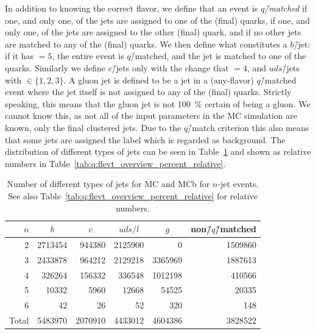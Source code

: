 In addition to knowing the correct flavor, we define that an event is \emph{$q$\=/matched} if one, and only one, of the jets are assigned to one of the (final) quarks, if one, and only one, of the jets are assigned to the other (final) quark, and if no other jets are matched to any of the (final) quarks. We then define what constitutes a $b$\=/jet: if it has  $= 5$, the entire event is $q$\=/matched, and the jet is matched to one of the quarks. Similarly we define $c$\=/jets only with the change that  $= 4$, and $uds$\=/jets with  $\in \{1, 2, 3\}$. A gluon jet is defined to be a jet in a (any-flavor) $q$\=/matched event where the jet itself is not assigned to any of the (final) quarks. Strictly speaking, this means that the gluon jet is not \SI{100}{\percent} certain of being a gluon. We cannot know this, as not all of the input parameters in the MC simulation are known, only the final clustered jets. Due to the $q$\=/match criterion this also means that some jets are assigned the label  which is regarded as background. The distribution of different types of jets can be seen in Table~\ref{tab:q:flevt_overview} and shown as relative numbers in Table~\ref{tab:q:flevt_overview_percent_relative}.
\vspace{-2mm}
\begin{table}[h!]
  \centering
  \begin{tabular}{@{}rrrrrr@{}}
    $n$    & \multicolumn{1}{c}{$b$} & \multicolumn{1}{c}{$c$} & \multicolumn{1}{c}{$uds / l$} & \multicolumn{1}{c}{$g$} & non\=/$q$\=/matched    \\ 
    \midrule
    \num{2}     & \num{2713454} &  \num{944380} & \num{2125900} &       \num{0} & \num{1509860} \\
    \num{3}     & \num{2433878} &  \num{964212} & \num{2129218} & \num{3365969} & \num{1887613} \\
    \num{4}     &  \num{326264} &  \num{156332} &  \num{336548} & \num{1012198} &  \num{410566} \\
    \num{5}     &   \num{10332} &    \num{5960} &   \num{12668} &   \num{54525} &   \num{20335} \\
    \num{6}     &      \num{42} &      \num{26} &      \num{52} &     \num{320} &     \num{148} \\
    \midrule
    Total & \num{5483970} & \num{2070910} & \num{4433012} & \num{4604386} & \num{3828522} \\
  \end{tabular}
  \caption{Number of different types of jets for MC and MCb for $n$-jet events. See also Table~\ref{tab:q:flevt_overview_percent_relative} for relative numbers.}
  \label{tab:q:flevt_overview}
\end{table}
\vspace{-5mm}

